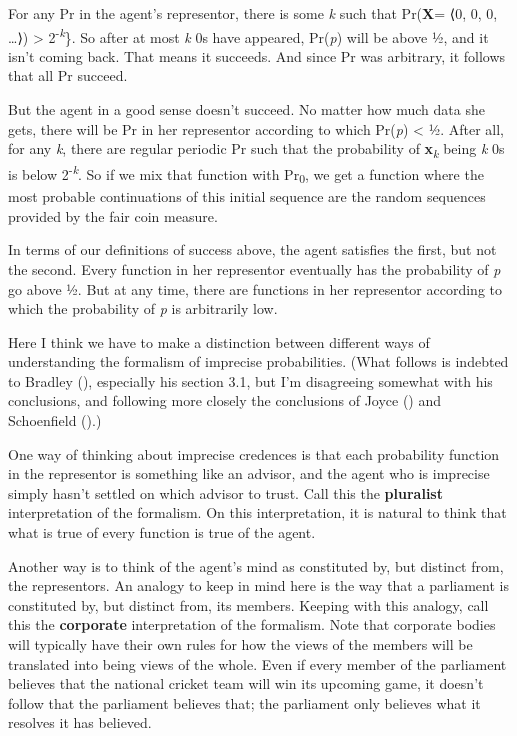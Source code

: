 \documentclass[
  10pt,
  letterpaper,
  DIV=11,
  numbers=noendperiod,
  twoside]{scrartcl}
\begin{document}
For any Pr in the agent's representor, there is some \emph{k} such that
Pr(\textbf{X}= ⟨0, 0, 0, \dots⟩) \textgreater{}
2\textsuperscript{-\emph{k}}\}. So after at most \emph{k} 0s have
appeared, Pr(\emph{p}) will be above ½, and it isn't coming back. That
means it succeeds. And since Pr was arbitrary, it follows that all Pr
succeed.

But the agent in a good sense doesn't succeed. No matter how much data
she gets, there will be Pr in her representor according to which
Pr(\emph{p}) \textless{} ½. After all, for any \emph{k}, there are
regular periodic Pr such that the probability of
\textbf{x}\textsubscript{\emph{k}} being \emph{k} 0s is below
2\textsuperscript{-\emph{k}}. So if we mix that function with
Pr\textsubscript{0}, we get a function where the most probable
continuations of this initial sequence are the random sequences provided
by the fair coin measure.

In terms of our definitions of success above, the agent satisfies the
first, but not the second. Every function in her representor eventually
has the probability of \emph{p} go above ½. But at any time, there are
functions in her representor according to which the probability of
\emph{p} is arbitrarily low.

Here I think we have to make a distinction between different ways of
understanding the formalism of imprecise probabilities. (What follows is
indebted to Bradley (), especially his
section 3.1, but I'm disagreeing somewhat with his conclusions, and
following more closely the conclusions of Joyce
() and Schoenfield
().)

One way of thinking about imprecise credences is that each probability
function in the representor is something like an advisor, and the agent
who is imprecise simply hasn't settled on which advisor to trust. Call
this the \textbf{pluralist} interpretation of the formalism. On this
interpretation, it is natural to think that what is true of every
function is true of the agent.

Another way is to think of the agent's mind as constituted by, but
distinct from, the representors. An analogy to keep in mind here is the
way that a parliament is constituted by, but distinct from, its members.
Keeping with this analogy, call this the \textbf{corporate}
interpretation of the formalism. Note that corporate bodies will
typically have their own rules for how the views of the members will be
translated into being views of the whole. Even if every member of the
parliament believes that the national cricket team will win its upcoming
game, it doesn't follow that the parliament believes that; the
parliament only believes what it resolves it has believed.
\end{document}
